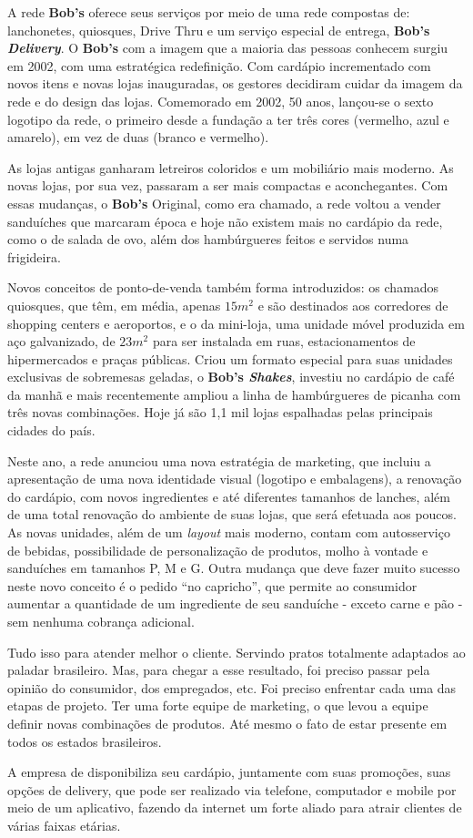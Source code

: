 		A rede \textbf{Bob’s} oferece seus serviços por meio de uma rede compostas de: lanchonetes, quiosques, Drive Thru e um serviço especial de entrega, \textbf{Bob’s \emph{Delivery}}. O \textbf{Bob’s} com a imagem que a maioria das pessoas conhecem surgiu em 2002, com uma estratégica redefinição. Com cardápio incrementado com novos itens e novas lojas inauguradas, os gestores decidiram cuidar da imagem da rede e do design das lojas. Comemorado em 2002, 50 anos, lançou-se o sexto logotipo da rede, o primeiro desde a fundação a ter três cores (vermelho, azul e amarelo), em vez de duas (branco e vermelho). 

		As lojas antigas ganharam letreiros coloridos e um mobiliário mais moderno. As novas lojas, por sua vez, passaram a ser mais compactas e aconchegantes. Com essas mudanças, o \textbf{Bob’s} Original, como era chamado, a rede voltou a vender sanduíches que marcaram época e hoje não existem mais no cardápio da rede, como o de salada de ovo, além dos hambúrgueres feitos e servidos numa frigideira.

		Novos conceitos de ponto-de-venda também forma introduzidos: os chamados quiosques, que têm, em média, apenas $15 m^2$ e são destinados aos corredores de shopping centers e aeroportos, e o da mini-loja, uma unidade móvel produzida em aço galvanizado, de $23 m^2$ para ser instalada em ruas, estacionamentos de hipermercados e praças públicas. Criou um formato especial para suas unidades exclusivas de sobremesas geladas, o \textbf{Bob’s \emph{Shakes}}, investiu no cardápio de café da manhã e mais recentemente ampliou a linha de hambúrgueres de picanha com três novas combinações. Hoje já são 1,1 mil lojas espalhadas pelas principais cidades do país. 

		Neste ano, a rede anunciou uma nova estratégia de marketing, que incluiu a apresentação de uma nova identidade visual (logotipo e embalagens), a renovação do cardápio, com novos ingredientes e até diferentes tamanhos de lanches, além de uma total renovação do ambiente de suas lojas, que será efetuada aos poucos. As novas unidades, além de um \emph{layout} mais moderno, contam com autosserviço de bebidas, possibilidade de personalização de produtos, molho à vontade e sanduíches em tamanhos P, M e G. Outra mudança que deve fazer muito sucesso neste novo conceito é o pedido “no capricho”, que permite ao consumidor aumentar a quantidade de um ingrediente de seu sanduíche - exceto carne e pão - sem nenhuma cobrança adicional.

		Tudo isso para atender melhor o cliente. Servindo pratos totalmente adaptados ao paladar brasileiro. Mas, para chegar a esse resultado, foi preciso passar pela opinião do consumidor, dos empregados, etc. Foi preciso enfrentar cada uma das etapas de projeto. Ter uma forte equipe de marketing, o que levou a equipe definir novas combinações de produtos. Até mesmo o fato de estar presente em todos os estados brasileiros. 

		A empresa de disponibiliza seu cardápio, juntamente com suas promoções, suas opções de delivery, que pode ser realizado via telefone, computador e mobile por meio de um aplicativo, fazendo da internet um forte aliado para atrair clientes de várias faixas etárias. 